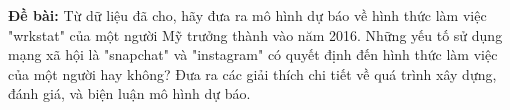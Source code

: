 \documentclass[14pt, a4paper]{article}
\numberwithin{equation}{section}
\numberwithin{figure}{section}
\theoremstyle{sltheorem}
\theoremstyle{soltheorem}
\begin{document}
\begin{titlepage}






    \vfill %

\end{titlepage}

\nocite{*}


\textbf{Đề bài: }Từ dữ liệu đã cho, hãy đưa ra mô hình dự báo về hình thức làm việc "wrkstat" của một người Mỹ trưởng thành vào năm 2016. 
Những yếu tố sử dụng mạng xã hội là "snapchat" và "instagram" có quyết định đến hình thức làm việc của một người hay không? 
Đưa ra các giải thích chi tiết về quá trình xây dựng, đánh giá, và biện luận mô hình dự báo.


        
            

            
\end{document}
